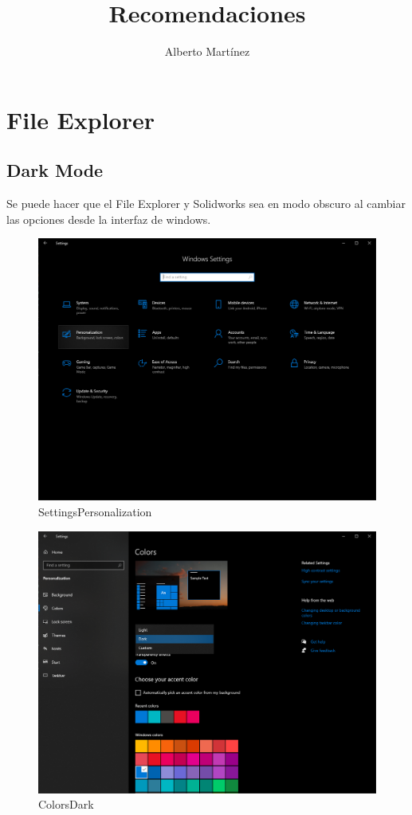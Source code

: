 \documentclass{report}
\begin{document}
\title{Recomendaciones}
\author{Alberto Martínez}

\maketitle

\tableofcontents
	
\part{File Explorer}

\chapter{Dark Mode}

Se puede hacer que el File Explorer y Solidworks sea en modo obscuro al cambiar las opciones desde la interfaz de windows.

\begin{figure}[H]
	\centering
	\includegraphics[width=0.85\linewidth, height=0.5\textheight,keepaspectratio]{Imagenes/fe_dark_mode01}
	\caption{Settings\textrightarrow Personalization}
	\label{fig:fedarkmode01}
\end{figure}

\begin{figure}[H]
	\centering
	\includegraphics[width=0.85\linewidth, height=0.5\textheight,keepaspectratio]{Imagenes/fe_dark_mode02}
	\caption{Colors\textrightarrow Dark}
	\label{fig:fedarkmode02}
\end{figure}
\end{document}
